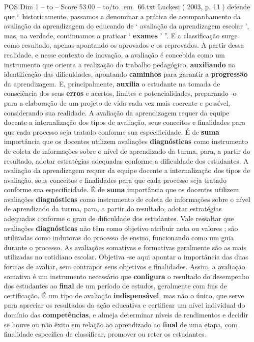 \begin{textsample}{POS Dim 1 – to – Score 53.00 – to/to\_em\_66.txt}
Luckesi ( 2003, p. 11 ) defende que “ historicamente, passamos a denominar a prática de acompanhamento da avaliação da aprendizagem do educando de ‘ avaliação da aprendizagem escolar ’, mas, na verdade, continuamos a praticar ‘ \textbf{exames} ’ ”.
E a classificação surge como resultado, apenas apontando os aprovados e os reprovados.
A partir dessa realidade, e nesse contexto de inovação, a avaliação é concebida como um instrumento que orienta a realização do trabalho pedagógico, \textbf{auxiliando} na identificação das dificuldades, apontando \textbf{caminhos} para garantir a \textbf{progressão} da aprendizagem.
E, principalmente, \textbf{auxilia} o estudante na tomada de consciência dos seus \textbf{erros} e acertos, limites e potencialidades, preparando -o para a elaboração de um projeto de vida cada vez mais coerente e possível, considerando sua realidade.
A avaliação da aprendizagem requer da equipe docente a internalização dos tipos de avaliação, seus conceitos e finalidades para que cada processo seja tratado conforme sua especificidade.
É de \textbf{suma} importância que os docentes utilizem avaliações \textbf{diagnósticas} como instrumento de coleta de informações sobre o nível de aprendizado da turma, para, a partir do resultado, adotar estratégias adequadas conforme a dificuldade dos estudantes.
A avaliação da aprendizagem requer da equipe docente a internalização dos tipos de avaliação, seus conceitos e finalidades para que cada processo seja tratado conforme sua especificidade.
É de \textbf{suma} importância que os docentes utilizem avaliações \textbf{diagnósticas} como instrumento de coleta de informações sobre o nível de aprendizado da turma, para, a partir do resultado, adotar estratégias adequadas conforme o grau de dificuldade dos estudantes.
Vale ressaltar que avaliações \textbf{diagnósticas} não têm como objetivo atribuir nota ou valores ; são utilizadas como indutoras do processo de ensino, funcionando como um guia durante o processo.
As avaliações somativas e formativas geralmente são as mais utilizadas no cotidiano escolar.
Objetiva -se aqui apontar a importância das duas formas de avaliar, sem contrapor seus objetivos e finalidades.
Assim, a avaliação somativa é um instrumento necessário que \textbf{configura} o resultado do desempenho dos estudantes ao \textbf{final} de um período de estudos, geralmente com fins de certificação.
É um tipo de avaliação \textbf{indispensável}, mas não o único, que serve para apreciar os resultados da ação educativa e certificar um nível individual do domínio das \textbf{competências}, e almeja determinar níveis de rendimentos e decidir se houve ou não êxito em relação ao aprendizado ao \textbf{final} de uma etapa, com finalidade específica de classificar, promover ou reter os estudantes.

\end{textsample}
